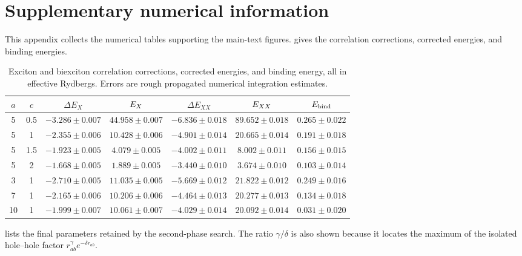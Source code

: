 \section{Supplementary numerical information}
\label{sec:supplement}

This appendix collects the numerical tables supporting the main-text figures.
 gives the correlation corrections, corrected energies, and
binding energies.

\begin{table}[ht]
\centering
\caption{Exciton and biexciton correlation corrections, corrected energies,
and binding energy, all in effective Rydbergs. Errors are rough propagated
numerical integration estimates.}
\label{tab:energies}
\footnotesize
\setlength{\tabcolsep}{3.5pt}
\begin{tabular}{ccccccc}
\toprule
$a$ & $c$ & $\Delta E_X$ & $E_X$ & $\Delta E_{XX}$ & $E_{XX}$ &
$E_{\mathrm{bind}}$\\
\midrule
5 & 0.5 & $-3.286\pm0.007$ & $44.958\pm0.007$ &
$-6.836\pm0.018$ & $89.652\pm0.018$ & $0.265\pm0.022$\\
5 & 1   & $-2.355\pm0.006$ & $10.428\pm0.006$ &
$-4.901\pm0.014$ & $20.665\pm0.014$ & $0.191\pm0.018$\\
5 & 1.5 & $-1.923\pm0.005$ & $4.079\pm0.005$ &
$-4.002\pm0.011$ & $8.002\pm0.011$ & $0.156\pm0.015$\\
5 & 2   & $-1.668\pm0.005$ & $1.889\pm0.005$ &
$-3.440\pm0.010$ & $3.674\pm0.010$ & $0.103\pm0.014$\\
3 & 1   & $-2.710\pm0.005$ & $11.035\pm0.005$ &
$-5.669\pm0.012$ & $21.822\pm0.012$ & $0.249\pm0.016$\\
7 & 1   & $-2.165\pm0.006$ & $10.206\pm0.006$ &
$-4.464\pm0.013$ & $20.277\pm0.013$ & $0.134\pm0.018$\\
10 & 1  & $-1.999\pm0.007$ & $10.061\pm0.007$ &
$-4.029\pm0.014$ & $20.092\pm0.014$ & $0.031\pm0.020$\\
\bottomrule
\end{tabular}
\end{table}

 lists the final parameters retained by the second-phase
search. The ratio $\gamma/\delta$ is also shown because it locates the
maximum of the isolated hole--hole factor
$r_{ab}^{\gamma}e^{-\delta r_{ab}}$.

